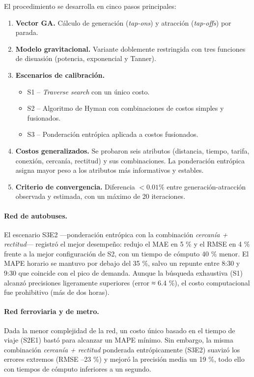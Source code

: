 \documentclass[openany]{book}
\begin{document}
		El procedimiento se desarrolla en cinco pasos principales:
		\begin{enumerate}
		  \item \textbf{Vector GA.} Cálculo de generación (\textit{tap-ons}) y atracción (\textit{tap-offs}) por parada.
		  \item \textbf{Modelo gravitacional.} Variante doblemente restringida con tres funciones de disuasión (potencia, exponencial y Tanner).
		  \item \textbf{Escenarios de calibración.}
				\begin{itemize}
				  \item S1 – \emph{Traverse search} con un único costo.
				  \item S2 – Algoritmo de Hyman con combinaciones de costos simples y fusionados.
				  \item S3 – Ponderación entrópica aplicada a costos fusionados.
				\end{itemize}
		  \item \textbf{Costos generalizados.} Se probaron seis atributos (distancia, tiempo, tarifa, conexión, cercanía, rectitud) y sus combinaciones. La ponderación entrópica asigna mayor peso a los atributos más informativos y estables.
		  \item \textbf{Criterio de convergencia.} Diferencia $<0.01\%$ entre generación-atracción observada y estimada, con un máximo de 20 iteraciones.
		\end{enumerate}

		\paragraph{Red de autobuses.}
		El escenario S3E2 —ponderación entrópica con la combinación \emph{cercanía + rectitud}— registró el mejor desempeño: redujo el MAE en 5 \% y el RMSE en 4 \% frente a la mejor configuración de S2, con un tiempo de cómputo 40 \% menor. El MAPE horario se mantuvo por debajo del 35 \%, salvo un repunte entre 8:30 y 9:30 que coincide con el pico de demanda. Aunque la búsqueda exhaustiva (S1) alcanzó precisiones ligeramente superiores (error ≈ 6.4 \%), el costo computacional fue prohibitivo (más de dos horas).

		\paragraph{Red ferroviaria y de metro.}
		Dada la menor complejidad de la red, un costo único basado en el tiempo de viaje (S2E1) bastó para alcanzar un MAPE mínimo. Sin embargo, la misma combinación \emph{cercanía + rectitud} ponderada entrópicamente (S3E2) suavizó los errores extremos (RMSE –23 \%) y mejoró la precisión media un 19 \%, todo ello con tiempos de cómputo inferiores a un segundo.
\end{document}

